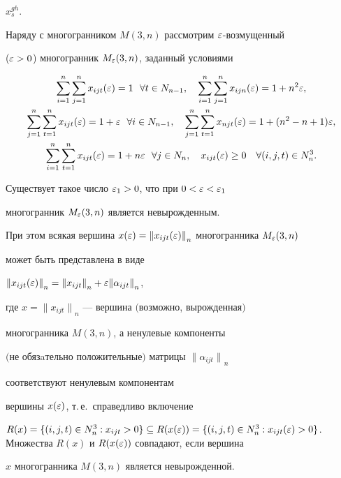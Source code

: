 $x_s^{gh}$.





Наряду с многогранником $M(3,n)$ рассмотрим $\varepsilon$-возмущенный


($\varepsilon > 0$) многогранник $M_\varepsilon (3,n)$, заданный условиями


\begin{gather*}


\sum\limits_{i=1}^n\sum\limits_{j=1}^n x_{ijt}(\eps)=1


\ \ \forall t\in N_{n-1},\quad


\sum\limits_{i=1}^n\sum\limits_{j=1}^n x_{ijn}(\eps)=1+n^2\eps, \\


%


\sum\limits_{j=1}^n\sum\limits_{t=1}^n x_{ijt}(\eps)=1+\eps


\ \ \forall i\in N_{n-1},\quad


\sum\limits_{j=1}^n\sum\limits_{t=1}^n x_{njt}(\eps)=1+(n^2-n+1)\eps, \\


%


\sum\limits_{i=1}^n\sum\limits_{t=1}^n x_{ijt}(\eps)=1+n\eps


\ \ \forall j\in N_n,\quad


x_{ijt}(\eps)\geq 0\quad\forall (i,j,t)\in N^3_n.


\end{gather*}





\begin{lem}


Существует такое число $\varepsilon_1 > 0$, что при $0<\varepsilon<\varepsilon_1$


многогранник $M_\varepsilon (3,n)$ является невырожденным. 


При этом всякая вершина $x(\eps)


={\|x_{ijt}(\eps)\|}_n$ многогранника $M_\eps (3,n)$ 


может быть представлена в виде


${\|x_{ijt}(\varepsilon)\|}_n ={\|x_{ijt}\|}_n + \varepsilon{\|\alpha_{ijt}\|}_n$,


где $x={\|x_{ijt}\|}_n$ --- вершина $($возможно, вырожденная\/$)$


многогранника $M(3,n)$, а ненулевые компоненты


$($не обязaтельно положительные\/$)$ матрицы ${\|\alpha_{ijt}\|}_n$


соответствуют ненулевым компонентам 


вершины $x(\varepsilon)$, т.\,е.\ справедливо включение


$R(x)=\{(i,j,t)\in N_n^3:x_{ijt}>0\}\subseteq R(x(\eps))=\{(i,j,t)\in N_n^3:


x_{ijt}(\eps)>0\}$. Множества $R(x)$ и $R(x(\eps))$ совпадают, если вершина


$x$ многогранника $M(3,n)$ является невырожденной.


\end{lem}





